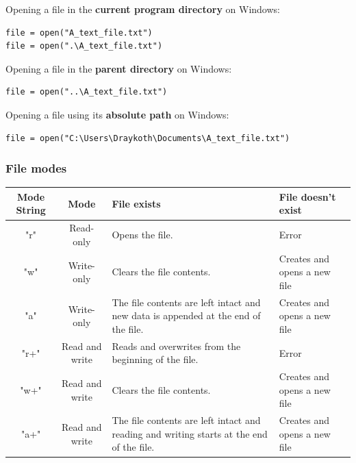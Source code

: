 \documentclass[11pt]{article}
\begin{document}
 \noindent Opening a file in the \textbf{current program directory} on Windows:
\begin{verbatim}
file = open("A_text_file.txt")
file = open(".\A_text_file.txt")
\end{verbatim}

 \noindent Opening a file in the \textbf{parent directory} on Windows:
\begin{verbatim}
file = open("..\A_text_file.txt")
\end{verbatim}

 \noindent Opening a file using its \textbf{absolute path} on Windows:
\begin{verbatim}
file = open("C:\Users\Draykoth\Documents\A_text_file.txt")
\end{verbatim}

\subsubsection{File modes}
\label{sec:orge5ee1c6}
\begin{center}
\begin{tabular}{|c|c|m{10em}|m{10em}|}
\hline
Mode String & Mode & File exists & File doesn't exist\\[0pt]
\hline
"r" & Read-only & Opens the file. & Error\\[0pt]
\hline
"w" & Write-only & Clears the file contents. & Creates and opens a new file\\[0pt]
\hline
"a" & Write-only & The file contents are left intact and new data is appended at the end of the file. & Creates and opens a new file\\[0pt]
\hline
"r+" & Read and write & Reads and overwrites from the beginning of the file. & Error\\[0pt]
\hline
"w+" & Read and write & Clears the file contents. & Creates and opens a new file\\[0pt]
\hline
"a+" & Read and write & The file contents are left intact and reading and writing starts at the end of the file. & Creates and opens a new file\\[0pt]
\hline
\end{tabular}
\end{center}
\end{document}
